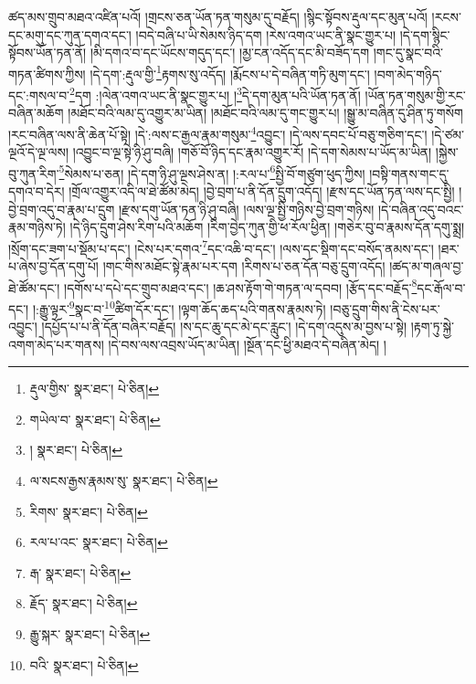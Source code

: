 ཚད་མས་གྲུབ་མཐའ་འཛིན་པའོ། །གྲངས་ཅན་ཡོན་ཏན་གསུམ་དུ་བརྗོད། །སྙིང་སྟོབས་རྡུལ་དང་མུན་པའོ། །རངས་དང་མགུ་དང་ཀུན་དགའ་དང་། །བདེ་བཞི་པ་ཡི་སེམས་ཉིད་དག །རེས་འགའ་ཡང་ནི་སྣང་གྱུར་པ། །དེ་དག་སྙིང་སྟོབས་ཡོན་ཏན་ནོ། །མི་དགའ་བ་དང་ཡོངས་གདུད་དང་། །མྱ་ངན་འདོད་དང་མི་བཟོད་དག །གང་དུ་སྣང་བའི་གཏན་ཚིགས་ཀྱིས། །དེ་དག་:རྡུལ་གྱི་\footnote{རྡུལ་གྱིས་  སྣར་ཐང་།  པེ་ཅིན། }རྟགས་སུ་འདོད། །རྨོངས་པ་དེ་བཞིན་གཏི་མུག་དང་། །བག་མེད་གཉིད་དང་:གསལ་བ་\footnote{གཡེལ་བ་  སྣར་ཐང་།  པེ་ཅིན། }དག :།ལེན་འགའ་ཡང་ནི་སྣང་གྱུར་པ། །\footnote{།  སྣར་ཐང་།  པེ་ཅིན། }དེ་དག་མུན་པའི་ཡོན་ཏན་ནོ། །ཡོན་ཏན་གསུམ་གྱི་རང་བཞིན་མཆོག །མཐོང་བའི་ལམ་དུ་འགྱུར་མ་ཡིན། །མཐོང་བའི་ལམ་དུ་གང་གྱུར་པ། །སྒྱུ་མ་བཞིན་དུ་ཤིན་ཏུ་གསོག །རང་བཞིན་ལས་ནི་ཆེན་པོ་སྟེ། །དེ་:ལས་ང་རྒྱལ་རྣམ་གསུམ་\footnote{ལ་སངས་རྒྱས་རྣམས་སུ་  སྣར་ཐང་།  པེ་ཅིན། }འབྱུང་། །དེ་ལས་དབང་པོ་བཅུ་གཅིག་དང་། །དེ་ཙམ་ལྔའོ་དེ་ལྔ་ལས། །འབྱུང་བ་ལྔ་སྟེ་ཉི་ཤུ་བཞི། །གཅོ་བོ་ཉིད་དང་རྣམ་འགྱུར་རོ། །དེ་དག་སེམས་པ་ཡོད་མ་ཡིན། །སྐྱེས་བུ་ཀུན་རིག་\footnote{རིགས་  སྣར་ཐང་།  པེ་ཅིན། }སེམས་པ་ཅན། །དེ་དག་ཉི་ཤུ་ལྔས་ཤེས་ན། །:རལ་པ་\footnote{རལ་པ་འང་  སྣར་ཐང་།  པེ་ཅིན། }སྤྱི་བོ་གཙུག་ཕུད་ཀྱིས། །བསྟི་གནས་གང་དུ་དགའ་བ་དེར། །གྲོལ་འགྱུར་འདི་ལ་ཐེ་ཚོམ་མེད། །བྱེ་བྲག་པ་ནི་དོན་དྲུག་འདོད། །རྫས་དང་ཡོན་ཏན་ལས་དང་སྤྱི། །བྱེ་བྲག་འདུ་བ་རྣམ་པ་དྲུག །རྫས་དགུ་ཡོན་ཏན་ཉི་ཤུ་བཞི། །ལས་ལྔ་སྤྱི་གཉིས་བྱེ་བྲག་གཉིས། །དེ་བཞིན་འདུ་བའང་རྣམ་གཉིས་ཏེ། །དེ་ཉིད་དྲུག་ཤེས་རིག་པའི་མཆོག །རིག་བྱེད་ཀུན་གྱི་ཕ་རོལ་ཕྱིན། །གཅེར་བུ་བ་རྣམས་དོན་དགུ་སྨྲ། །སྲོག་དང་ཟག་པ་སྡོམ་པ་དང་། །ངེས་པར་དགའ་\footnote{རྒ་  སྣར་ཐང་།  པེ་ཅིན། }དང་འཆི་བ་དང་། །ལས་དང་སྡིག་དང་བསོད་ནམས་དང་། །ཐར་པ་ཞེས་བྱ་དོན་དགུ་པོ། །གང་གིས་མཐོང་སྟེ་རྣམ་པར་དག །རིགས་པ་ཅན་དོན་བཅུ་དྲུག་འདོད། །ཚད་མ་གཞལ་བྱ་ཐེ་ཚོམ་དང་། །དགོས་པ་དཔེ་དང་གྲུབ་མཐའ་དང་། །ཆ་ཤས་རྟོག་གེ་གཏན་ལ་དབབ། །རྩོད་དང་བརྗོད་\footnote{རྗོད་  སྣར་ཐང་།  པེ་ཅིན། }དང་རྒོལ་བ་དང་། །:རྒྱུ་ལྟར་\footnote{རྒྱུ་སྐར་  སྣར་ཐང་།  པེ་ཅིན། }སྣང་བ་\footnote{བའི་  སྣར་ཐང་།  པེ་ཅིན། }ཚིག་དོར་དང་། །ལྟག་ཆོད་ཆད་པའི་གནས་རྣམས་ཏེ། །བཅུ་དྲུག་གིས་ནི་ངེས་པར་འབྱུང་། །དཔྱོད་པ་པ་ནི་དོན་བཞིར་བརྗོད། །ས་དང་ཆུ་དང་མེ་དང་རླུང་། །དེ་དག་འདུས་མ་བྱས་པ་སྟེ། །རྟག་ཏུ་སྐྱེ་འགག་མེད་པར་གནས། །དེ་བས་ལས་འབྲས་ཡོད་མ་ཡིན། །སྔོན་དང་ཕྱི་མཐའ་དེ་བཞིན་མེད། །
